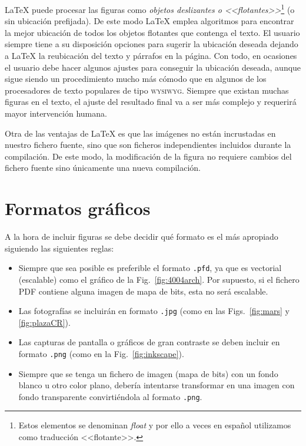 \documentclass[11pt,a4paper]{article}
\begin{document}
\LaTeX{} puede procesar las figuras como \emph{objetos deslizantes o <<flotantes>>}\footnote{Estos elementos se denominan \textit{float} y por ello a veces en español utilizamos como traducción <<flotante>>.} (o sin ubicación prefijada). De este modo \LaTeX{} emplea algoritmos para encontrar la mejor ubicación de todos los objetos flotantes que contenga el texto. El usuario siempre tiene a su disposición opciones para sugerir la ubicación deseada dejando a \LaTeX{} la reubicación del texto y párrafos en la página. Con todo, en ocasiones el usuario debe hacer algunos ajustes para conseguir la ubicación deseada, aunque sigue siendo un procedimiento mucho más cómodo que en algunos de los procesadores de texto populares de tipo \textsc{wysiwyg}. Siempre que existan muchas figuras en el texto, el ajuste del resultado final va a ser más complejo y requerirá mayor intervención humana.

Otra de las ventajas de \LaTeX{} es que las imágenes no están incrustadas en nuestro fichero fuente, sino que son ficheros independientes incluidos durante la compilación. De este modo, la modificación de la figura no requiere cambios del fichero fuente sino únicamente una nueva compilación.








\section{Formatos gráficos}
A la hora de incluir figuras se debe decidir qué formato es el más apropiado siguiendo las siguientes reglas:
\begin{itemize}
	\item Siempre que sea posible es preferible el formato \texttt{.pfd}, ya que es vectorial (escalable) como el gráfico de la Fig.~\ref{fig:4004arch}. Por supuesto, si el fichero \textsf{PDF} contiene alguna imagen de mapa de bits, esta no será escalable.
	\item Las fotografías se incluirán en formato \texttt{.jpg} (como en las  Figs.~\ref{fig:mars} y \ref{fig:plazaCR}).
	\item Las capturas de pantalla o gráficos de gran contraste se deben incluir en formato \texttt{.png} (como en la Fig.~\ref{fig:inkscape}). 
	\item Siempre que se tenga un fichero de imagen (mapa de bits) con un fondo blanco u otro color plano, debería intentarse transformar en una imagen con fondo transparente convirtiéndola al formato \texttt{.png}.
\end{itemize}
\end{document}
